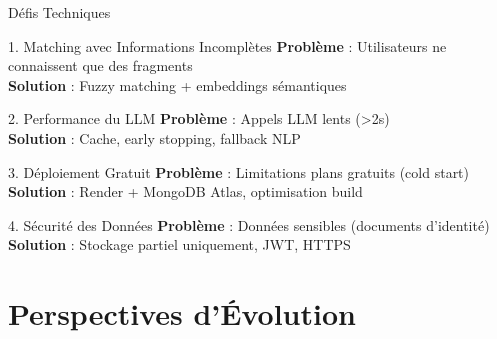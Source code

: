 \documentclass[aspectratio=169]{beamer}
\begin{document}
\begin{frame}{Défis Techniques}
    \begin{block}{1. Matching avec Informations Incomplètes}
        \textbf{Problème} : Utilisateurs ne connaissent que des fragments \\
        \textbf{Solution} : Fuzzy matching + embeddings sémantiques
    \end{block}

    \begin{block}{2. Performance du LLM}
        \textbf{Problème} : Appels LLM lents (>2s) \\
        \textbf{Solution} : Cache, early stopping, fallback NLP
    \end{block}

    \begin{block}{3. Déploiement Gratuit}
        \textbf{Problème} : Limitations plans gratuits (cold start) \\
        \textbf{Solution} : Render + MongoDB Atlas, optimisation build
    \end{block}

    \begin{block}{4. Sécurité des Données}
        \textbf{Problème} : Données sensibles (documents d'identité) \\
        \textbf{Solution} : Stockage partiel uniquement, JWT, HTTPS
    \end{block}
\end{frame}

\section{Perspectives d'Évolution}
\end{document}
